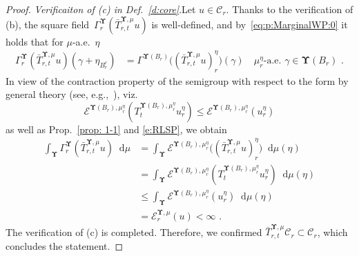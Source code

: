 \documentclass[11pt,letterpaper]{amsart}
\newcommand{\dom}[1]{\mathcal D(#1)}
\newcommand{\diff}{\mathop{}\!\mathrm{d}}
\newcommand{\fstop}{\,\,\mathrm{.}}
\newcommand{\cdc}{\Gamma}
\newcommand{\purple}[1]{{\color{purple}#1}}
\newcommand{\QP}{{\mu}}
\newcommand{\dUpsilon}{{\mathbf \Upsilon}}
\newcommand{\U}{\dUpsilon}
\newcommand{\E}{\mathcal E}
\renewcommand{\1}{\mathbf 1}
\numberwithin{equation}{section}
\theoremstyle{plain}
\theoremstyle{definition}
\theoremstyle{remark}
\renewcommand{\paragraph}[1]{\medskip\emph{#1}.\quad}
\begin{document}
\begin{proof}
\paragraph{Verificaiton of (c) in Def.~\ref{d:core}}Let $u \in \mathcal C_r$. Thanks to the verification of (b), the square field~$\cdc^{\dUpsilon}_r(\bar{T}_{r, t}^{\U, \QP} u)$ is well-defined, and by~\eqref{eq:p:MarginalWP:0} it holds that for $\QP$-a.e.~$\eta$
\begin{align} \label{e:RLSP}
\cdc^{\dUpsilon}_r(\bar{T}_{r, t}^{\U, \QP} u)(\gamma+\eta_{B_r^c}) &= \cdc^{\dUpsilon(B_r)}\bigl((\bar{T}_{r, t}^{\U, \QP} u)_{r}^\eta\bigr)(\gamma) \quad \text{$\mu_{r}^\eta$-a.e.~$\gamma \in \U(B_r)$} \fstop 
\end{align}
In view of the contraction property of the semigroup with respect to the form by general theory (see, e.g.,~\cite[p.23, Lem.~1.3.3]{FukOshTak11}), viz.
$$\E^{\U(B_r), \QP_r^{\eta}}(T_{t}^{\U(B_r), \QP_r^{\eta}} u_{r}^\eta) \le \E^{\U(B_r), \QP_r^{\eta}}(u_{r}^\eta)$$
as well as Prop.~\ref{prop: 1-1} and \eqref{e:RLSP}, we obtain
\begin{align*}
\int_{\U} \cdc^{\dUpsilon}_r(\bar{T}_{r, t}^{\U, \QP} u) \diff \QP &= \int_{\U} \E^{\U(B_r), \QP_r^{\eta}}\bigl((\bar{T}_{r, t}^{\U, \QP} u)_{r}^\eta \bigr)  \diff \mu(\eta)
\\
&= \int_{\U} \E^{\U(B_r), \QP_r^{\eta}}(T_{t}^{\U(B_r), \QP_r^{\eta}} u_{r}^\eta)  \diff \mu(\eta)
\\
&\le   \int_{\U} \E^{\U(B_r), \QP_r^{\eta}}(u_{r}^\eta) \diff\mu(\eta) 
\\
&=   \E_r^{\U, \QP}(u) <\infty \fstop
\end{align*}
The verification of (c) is completed. Therefore, we confirmed $\bar{T}_{r, t}^{\U, \QP} \mathcal C_r \subset \mathcal C_r$, which concludes the statement.  %
%

\end{proof}
\end{document}
